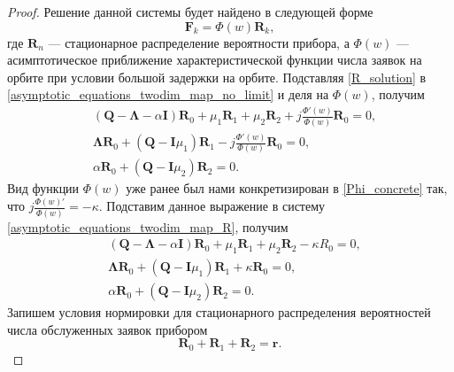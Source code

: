 \begin{proof}
Решение данной системы будет найдено в следующей форме
\begin{equation} \label{R_solution}
	\boldsymbol{F}_{k} = \Phi(w)\boldsymbol{R}_{k},
\end{equation}
где $\boldsymbol{R}_{n}$ --- стационарное распределение вероятности прибора, а $\Phi(w)$ --- асимптотическое приближение характеристической функции числа заявок на орбите при условии большой задержки на орбите. Подставляя \eqref{R_solution} в \eqref{asymptotic_equations_twodim_map_no_limit} и деля на $\Phi(w)$, получим
\begin{equation}
	\label{asymptotic_equations_twodim_map_R}
	\begin{split}
		&(\boldsymbol{Q}-\boldsymbol{\Lambda}-\alpha\boldsymbol{I})\boldsymbol{R}_{0} + \mu_{1} \boldsymbol{R}_{1}  +  \mu_{2}\boldsymbol{R}_{2} + j
		\frac{\Phi'(w) }{\Phi(w)}\boldsymbol{R}_{0}  = 0,
		\\
		&\boldsymbol{\Lambda} \boldsymbol{R}_{0} +  (\boldsymbol{Q} - \boldsymbol{I}\mu_{1})\boldsymbol{R}_{1} - j\frac{\Phi'(w) }{\Phi(w)}
		\boldsymbol{R}_{0}  = 0,
		\\
		&\alpha \boldsymbol{R}_{0} + (\boldsymbol{Q} - \boldsymbol{I}\mu_{2})\boldsymbol{R}_{2}  = 0.
	\end{split}
\end{equation}
Вид функции $\Phi(w)$ уже ранее был нами конкретизирован в \eqref{Phi_concrete} так, что $j\frac{\Phi(w)'}{\Phi(w)} = -\kappa$. 
Подставим данное выражение в систему \eqref{asymptotic_equations_twodim_map_R}, получим
\begin{equation}
	\label{asymptotic_equations_twodim_map_R_final}
	\begin{split}
		&(\boldsymbol{Q}-\boldsymbol{\Lambda}-\alpha\boldsymbol{I})\boldsymbol{R}_{0} + \mu_{1} \boldsymbol{R}_{1}  +  \mu_{2}\boldsymbol{R}_{2} -\kappa{R}_{0}  = 0,
		\\
		&\boldsymbol{\Lambda} \boldsymbol{R}_{0} +  (\boldsymbol{Q} - \boldsymbol{I}\mu_{1})\boldsymbol{R}_{1} + \kappa
		\boldsymbol{R}_{0}  = 0,
		\\
		&\alpha \boldsymbol{R}_{0} + (\boldsymbol{Q} - \boldsymbol{I}\mu_{2})\boldsymbol{R}_{2}  = 0.
	\end{split}
\end{equation}
Запишем условия нормировки для стационарного распределения вероятностей числа обслуженных заявок прибором
\begin{equation*}
	\boldsymbol{R}_{0} + \boldsymbol{R}_{1} + \boldsymbol{R}_{2} = \boldsymbol{r}.
\end{equation*}

\end{proof}
